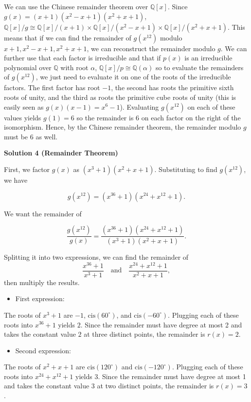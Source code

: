 \begin{enumerate}
We can use the Chinese remainder theorem over $\mathbb{Q}[x].$ Since $g(x)=(x+1)(x^2-x+1)(x^2+x+1)$, $\mathbb{Q}[x]/g\cong \mathbb{Q}[x]/(x+1)\times \mathbb{Q}[x]/(x^2-x+1)\times \mathbb{Q}[x]/(x^2+x+1).$ This means that if we can find the remainder of $g(x^{12})$ modulo $x+1,x^2-x+1,x^2+x+1$, we can reconstruct the remainder modulo $g.$ We can further use that each factor is irreducible and that if $p(x)$ is an irreducible polynomial over $\mathbb{Q}$ with root $\alpha$, $\mathbb{Q}[x]/p\cong \mathbb{Q}(\alpha)$ so to evaluate the remainders of $g(x^{12})$, we just need to evaluate it on one of the roots of the irreducible factors. The first factor has root $-1$, the second has roots the primitive sixth roots of unity, and the third as roots the primitive cube roots of unity (this is easily seen as $g(x)(x-1)=x^6-1$). Evaluating $g(x^{12})$ on each of these values yields $g(1)=6$ so the remainder is $6$ on each factor on the right of the isomorphism. Hence, by the Chinese remainder theorem, the remainder modulo $g$ must be $\boxed{6}$ as well.

 



\textbf{Solution 4 (Remainder Theorem)}

First, we factor \(g(x)\) as \((x^3+1)(x^2+x+1)\). Substituting to find \(g(x^{12})\), we have  

 
 \[g(x^{12})=(x^{36}+1)(x^{24}+x^{12}+1).\]

 We want the remainder of  

 
 \[\frac{g(x^{12})}{g(x)}=\frac{(x^{36}+1)(x^{24}+x^{12}+1)}{(x^{3}+1)(x^{2}+x+1)}.\]

 Splitting it into two expressions, we can find the remainder of  
 \[\frac{x^{36}+1}{x^{3}+1}\quad \text{and} \quad\frac{x^{24}+x^{12}+1}{x^{2}+x+1},\]then multiply the results.  

 
            \begin{itemize}
        \item First expression:
            \end{itemize}
            The roots of \(x^{3}+1\) are \(-1\), \(\text{cis}(60^\circ)\), and \(\text{cis}(-60^\circ)\). Plugging each of these roots into \(x^{36}+1\) yields \(2\). Since the remainder must have degree at most 2 and takes the constant value \(2\) at three distinct points, the remainder is \(r(x)=2\).  

 
            \begin{itemize}
        \item Second expression:
            \end{itemize}
            The roots of \(x^{2}+x+1\) are \(\text{cis}(120^\circ)\) and \(\text{cis}(-120^\circ)\). Plugging each of these roots into \(x^{24}+x^{12}+1\) yields \(3\). Since the remainder must have degree at most 1 and takes the constant value \(3\) at two distinct points, the remainder is \(r(x)=3\).  


\end{enumerate}
